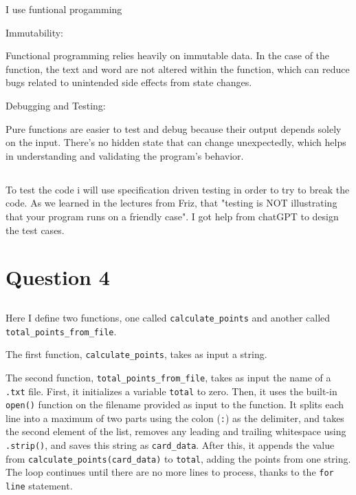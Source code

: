 \documentclass{article}
\begin{document}
I use funtional progamming

Immutability:

Functional programming relies heavily on immutable data. In the case of the function, the text and word are not altered within the function, which can reduce bugs related to unintended side effects from state changes.

Debugging and Testing:

Pure functions are easier to test and debug because their output depends solely on the input. There’s no hidden state that can change unexpectedly, which helps in understanding and validating the program's behavior.


\subsection{}

To test the code i will use specification driven testing in order to try to break the code. As we learned in the lectures from Friz, that "testing is NOT illustrating that your program runs on a friendly case". I got help from chatGPT to design the test cases.





\section{Question 4}
\subsection{}


Here I define two functions, one called \texttt{calculate\_points} and another called \texttt{total\_points\_from\_file}.

The first function, \texttt{calculate\_points}, takes as input a string.

The second function, \texttt{total\_points\_from\_file}, takes as input the name of a \texttt{.txt} file. First, it initializes a variable \texttt{total} to zero. Then, it uses the built-in \texttt{open()} function on the filename provided as input to the function. It splits each line into a maximum of two parts using the colon (\texttt{:}) as the delimiter, and takes the second element of the list, removes any leading and trailing whitespace using \texttt{.strip()}, and saves this string as \texttt{card\_data}. After this, it appends the value from \texttt{calculate\_points(card\_data)} to \texttt{total}, adding the points from one string. The loop continues until there are no more lines to process, thanks to the \texttt{for line} statement.
\end{document}
